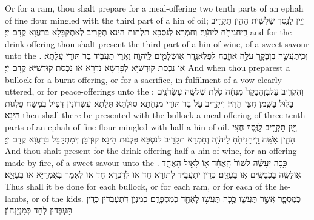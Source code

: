 {Or for a ram, thou shalt prepare for a meal-offering two tenth parts of an ephah of fine flour mingled with the third part of a hin of oil;}{}
{וְיַ֥יִן לַנֶּ֖סֶךְ שְׁלִשִׁ֣ית הַהִ֑ין תַּקְרִ֥יב רֵֽיחַ\maqqaf נִיחֹ֖חַ לַיהֹוָֽה׃}
{וְחַמְרָא לְנִסְכָּא תַּלְתוּת הִינָא תְּקָרֵיב לְאִתְקַבָּלָא בְּרַעֲוָא קֳדָם יְיָ׃}
{and for the drink-offering thou shalt present the third part of a hin of wine, of a sweet savour unto the \lord.}{}
{וְכִֽי\maqqaf תַעֲשֶׂ֥ה בֶן\maqqaf בָּקָ֖ר עֹלָ֣ה אוֹ\maqqaf זָ֑בַח לְפַלֵּא\maqqaf נֶ֥דֶר אֽוֹ\maqqaf שְׁלָמִ֖ים לַֽיהֹוָֽה׃}
{וַאֲרֵי תַעֲבֵיד בַּר תּוֹרֵי עֲלָתָא אוֹ נִכְסַת קוּדְשַׁיָּא לְפָרָשָׁא נִדְרָא אוֹ נִכְסַת קוּדְשַׁיָּא קֳדָם יְיָ׃}
{And when thou preparest a bullock for a burnt-offering, or for a sacrifice, in fulfilment of a vow clearly uttered, or for peace-offerings unto the \lord;}{}
{וְהִקְרִ֤יב עַל\maqqaf בֶּן\maqqaf הַבָּקָר֙ מִנְחָ֔ה סֹ֖לֶת שְׁלֹשָׁ֣ה עֶשְׂרֹנִ֑ים בָּל֥וּל בַּשֶּׁ֖מֶן חֲצִ֥י הַהִֽין׃}
{וִיקָרֵיב עַל בַּר תּוֹרֵי מִנְחָתָא סוּלְתָּא תְּלָתָא עֶשְׂרוֹנִין דְּפִיל בִּמְשַׁח פַּלְגוּת הִינָא׃}
{then shall there be presented with the bullock a meal-offering of three tenth parts of an ephah of fine flour mingled with half a hin of oil.}{}
{וְיַ֛יִן תַּקְרִ֥יב לַנֶּ֖סֶךְ חֲצִ֣י הַהִ֑ין אִשֵּׁ֥ה רֵֽיחַ\maqqaf נִיחֹ֖חַ לַיהֹוָֽה׃}
{וְחַמְרָא תְּקָרֵיב לְנִסְכָּא פַּלְגוּת הִינָא קוּרְבַּן דְּמִתְקַבַּל בְּרַעֲוָא קֳדָם יְיָ׃}
{And thou shalt present for the drink-offering half a hin of wine, for an offering made by fire, of a sweet savour unto the \lord.}{}
{כָּ֣כָה יֵעָשֶׂ֗ה לַשּׁוֹר֙ הָֽאֶחָ֔ד א֖וֹ לָאַ֣יִל הָאֶחָ֑ד אֽוֹ\maqqaf לַשֶּׂ֥ה בַכְּבָשִׂ֖ים א֥וֹ בָעִזִּֽים׃}
{כְּדֵין יִתְעֲבֵיד לְתוֹרָא חַד אוֹ לְדִכְרָא חַד אוֹ לְאִמַּר בְּאִמְּרַיָּא אוֹ בְעִזַּיָּא׃}
{Thus shall it be done for each bullock, or for each ram, or for each of the he-lambs, or of the kids.}{}
{כַּמִּסְפָּ֖ר אֲשֶׁ֣ר תַּעֲשׂ֑וּ כָּ֛כָה תַּעֲשׂ֥וּ לָאֶחָ֖ד כְּמִסְפָּרָֽם׃}
{כְּמִנְיַן דְּתַעְבְּדוּן כְּדֵין תַּעְבְּדוּן לְחַד כְּמִנְיָנְהוֹן׃}
